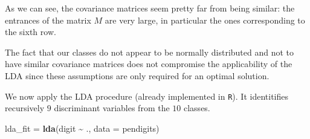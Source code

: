 \documentclass[
]{article}
\newenvironment{Shaded}{\begin{snugshade}}{\end{snugshade}}
\newcommand{\AttributeTok}[1]{\textcolor[rgb]{0.13,0.29,0.53}{#1}}
\newcommand{\FunctionTok}[1]{\textcolor[rgb]{0.13,0.29,0.53}{\textbf{#1}}}
\newcommand{\NormalTok}[1]{#1}
\newcommand{\OtherTok}[1]{\textcolor[rgb]{0.56,0.35,0.01}{#1}}
\newcommand{\SpecialCharTok}[1]{\textcolor[rgb]{0.81,0.36,0.00}{\textbf{#1}}}
\theoremstyle{plain}
\begin{document}
\smallskip

As we can see, the covariance matrices seem pretty far from being
similar: the entrances of the matrix \(M\) are very large, in particular
the ones corresponding to the sixth row.

The fact that our classes do not appear to be normally distributed and
not to have similar covariance matrices does not compromise the
applicability of the LDA since these assumptions are only required for
an optimal solution.

We now apply the LDA procedure (already implemented in \texttt{R}). It
identitifies recursively \(9\) discriminant variables from the \(10\)
classes.

\smallskip

\begin{Shaded}
\begin{Highlighting}[]
\NormalTok{lda\_fit }\OtherTok{=} \FunctionTok{lda}\NormalTok{(digit }\SpecialCharTok{\textasciitilde{}}\NormalTok{ ., }\AttributeTok{data =}\NormalTok{ pendigits)}
\end{Highlighting}
\end{Shaded}
\end{document}
